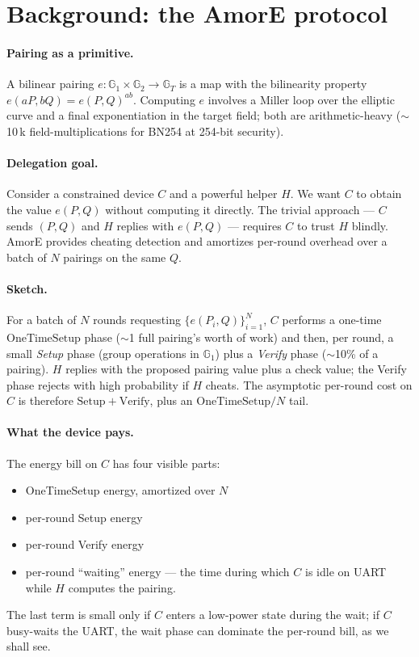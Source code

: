 \documentclass[11pt,a4paper]{article}
\begin{document}
\section{Background: the AmorE protocol}
\label{sec:background}

\paragraph{Pairing as a primitive.} A bilinear pairing $e\!:\!
\mathbb{G}_1\!\times\!\mathbb{G}_2 \to \mathbb{G}_T$ is a map with
the bilinearity property $e(aP, bQ) = e(P,Q)^{ab}$. Computing $e$
involves a Miller loop over the elliptic curve and a final
exponentiation in the target field; both are arithmetic-heavy
($\sim$10\,k field-multiplications for BN254 at 254-bit security).

\paragraph{Delegation goal.} Consider a constrained device $C$ and
a powerful helper $H$. We want $C$ to obtain the value $e(P, Q)$
without computing it directly. The trivial approach --- $C$ sends
$(P, Q)$ and $H$ replies with $e(P,Q)$ --- requires $C$ to trust
$H$ blindly. AmorE provides cheating detection and amortizes per-round
overhead over a batch of $N$ pairings on the same $Q$.

\paragraph{Sketch.} For a batch of $N$ rounds requesting
$\{e(P_i, Q)\}_{i=1}^{N}$, $C$ performs a one-time
$\mathrm{OneTimeSetup}$ phase ($\sim$1 full pairing's worth of work)
and then, per round, a small \emph{Setup} phase (group operations
in $\mathbb{G}_1$) plus a \emph{Verify} phase ($\sim$10\% of a
pairing). $H$ replies with the proposed pairing value plus a check
value; the Verify phase rejects with high probability if $H$ cheats.
The asymptotic per-round cost on $C$ is therefore
$\mathrm{Setup} + \mathrm{Verify}$, plus an
$\mathrm{OneTimeSetup}/N$ tail.

\paragraph{What the device pays.} The energy bill on $C$ has four
visible parts:
\begin{itemize}
  \item OneTimeSetup energy, amortized over $N$
  \item per-round Setup energy
  \item per-round Verify energy
  \item per-round ``waiting'' energy --- the time during which $C$
        is idle on UART while $H$ computes the pairing.
\end{itemize}
The last term is small only if $C$ enters a low-power state during
the wait; if $C$ busy-waits the UART, the wait phase can dominate
the per-round bill, as we shall see.
\end{document}
